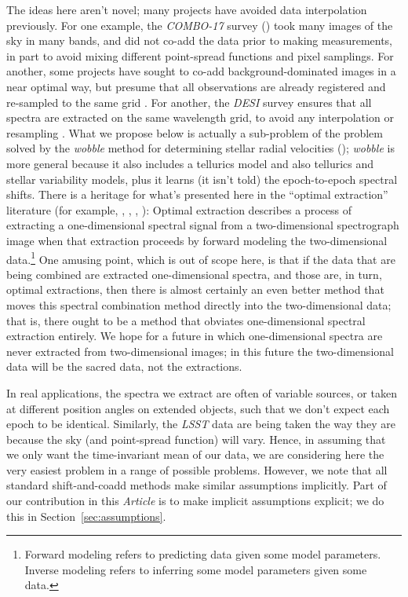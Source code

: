 \documentclass[modern, linenumbers]{aastex631}
\newcommand{\documentname}{\textsl{Article}}
\newcommand{\sectionname}{Section}
\newcommand{\secref}[1]{\sectionname~\ref{#1}}
\begin{document}
The ideas here aren't novel; many projects have avoided data interpolation previously.
For one example, the \textsl{COMBO-17} survey (\citealt{combo17}) took many images of the sky in many bands, and did not co-add the data prior to making measurements, in part to avoid mixing different point-spread functions and pixel samplings.
For another, some projects have sought to co-add background-dominated images in a near optimal way, but presume that all observations are already registered and re-sampled to the same grid \citep{zackay}.
For another, the \textsl{DESI} survey ensures that all spectra are extracted on the same wavelength grid, to avoid any interpolation or resampling \citep{desipipeline}.
What we propose below is actually a sub-problem of the problem solved by the \textsl{wobble} method for determining stellar radial velocities (\citealt{wobble}); \textsl{wobble} is more general because it also includes a tellurics model and also tellurics and stellar variability models,
plus it learns (it isn't told) the epoch-to-epoch spectral shifts.
There is a heritage for what's presented here in the ``optimal extraction'' literature (for example, \citealt{oe}, \citealt{kelson}, \citealt{froe}, \citealt{sp}):
Optimal extraction describes a process of extracting a one-dimensional spectral signal from a two-dimensional spectrograph image when that extraction proceeds by forward modeling the two-dimensional data.\footnote{Forward modeling refers to predicting data given some model parameters. Inverse modeling refers to inferring some model parameters given some data.}
One amusing point, which is out of scope here, is that if the data that are being combined are extracted one-dimensional spectra, and those are, in turn, optimal extractions, then there is almost certainly an even better method that moves this spectral combination method directly into the two-dimensional data; that is, there ought to be a method that obviates one-dimensional spectral extraction entirely.
We hope for a future in which one-dimensional spectra are never extracted from two-dimensional images; in this future the two-dimensional data will be the sacred data, not the extractions.

In real applications, the spectra we extract are often of variable sources, or taken at different position angles on extended objects, such that we don't expect each epoch to be identical.
Similarly, the \textsl{LSST} data are being taken the way they are because the sky (and point-spread function) will vary.
Hence, in assuming that we only want the time-invariant mean of our data, we are considering here the very easiest problem in a range of possible problems.
However, we note that all standard shift-and-coadd methods make similar assumptions implicitly.
Part of our contribution in this \documentname{} is to make implicit assumptions explicit; we do this in \secref{sec:assumptions}.
\end{document}
